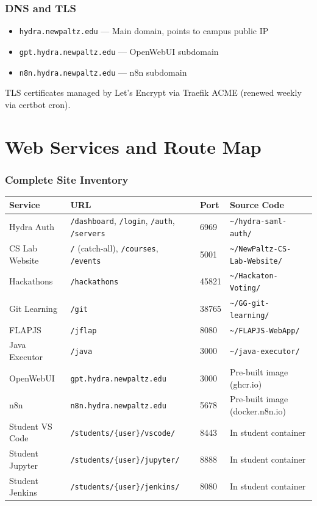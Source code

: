\documentclass[11pt,a4paper]{article}
\begin{document}
\section{DNS and TLS}

\begin{itemize}[nosep]
    \item \texttt{hydra.newpaltz.edu} --- Main domain, points to campus public IP
    \item \texttt{gpt.hydra.newpaltz.edu} --- OpenWebUI subdomain
    \item \texttt{n8n.hydra.newpaltz.edu} --- n8n subdomain
\end{itemize}

TLS certificates managed by Let's Encrypt via Traefik ACME (renewed weekly via certbot cron).

\newpage
\part{Web Services and Route Map}

\section{Complete Site Inventory}

\begin{longtable}{lp{3.5cm}lp{4cm}}
\toprule
\textbf{Service} & \textbf{URL} & \textbf{Port} & \textbf{Source Code} \\
\midrule
\endhead
Hydra Auth & \texttt{/dashboard}, \texttt{/login}, \texttt{/auth}, \texttt{/servers} & 6969 & \texttt{\~{}/hydra-saml-auth/} \\
CS Lab Website & \texttt{/} (catch-all), \texttt{/courses}, \texttt{/events} & 5001 & \texttt{\~{}/NewPaltz-CS-Lab-Website/} \\
Hackathons & \texttt{/hackathons} & 45821 & \texttt{\~{}/Hackaton-Voting/} \\
Git Learning & \texttt{/git} & 38765 & \texttt{\~{}/GG-git-learning/} \\
FLAPJS & \texttt{/jflap} & 8080 & \texttt{\~{}/FLAPJS-WebApp/} \\
Java Executor & \texttt{/java} & 3000 & \texttt{\~{}/java-executor/} \\
OpenWebUI & \texttt{gpt.hydra.newpaltz.edu} & 3000 & Pre-built image (ghcr.io) \\
n8n & \texttt{n8n.hydra.newpaltz.edu} & 5678 & Pre-built image (docker.n8n.io) \\
Student VS Code & \texttt{/students/\{user\}/vscode/} & 8443 & In student container \\
Student Jupyter & \texttt{/students/\{user\}/jupyter/} & 8888 & In student container \\
Student Jenkins & \texttt{/students/\{user\}/jenkins/} & 8080 & In student container \\
\bottomrule
\end{longtable}
\end{document}
